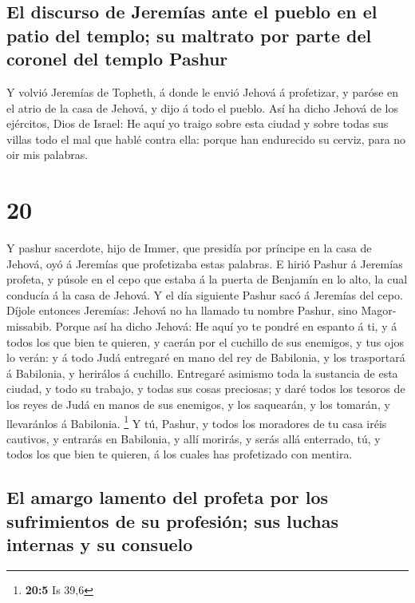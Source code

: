 \hypertarget{el-discurso-de-jeremuxedas-ante-el-pueblo-en-el-patio-del-templo-su-maltrato-por-parte-del-coronel-del-templo-pashur}{%
\subsection{El discurso de Jeremías ante el pueblo en el patio del
templo; su maltrato por parte del coronel del templo
Pashur}\label{el-discurso-de-jeremuxedas-ante-el-pueblo-en-el-patio-del-templo-su-maltrato-por-parte-del-coronel-del-templo-pashur}}

 Y volvió Jeremías de Topheth, á donde le envió Jehová á
profetizar, y paróse en el atrio de la casa de Jehová, y dijo á todo el
pueblo.  Así ha dicho Jehová de los ejércitos, Dios de
Israel: He aquí yo traigo sobre esta ciudad y sobre todas sus villas
todo el mal que hablé contra ella: porque han endurecido su cerviz, para
no oir mis palabras.

\hypertarget{section-19}{%
\section{20}\label{section-19}}

 Y pashur sacerdote, hijo de Immer, que presidía por
príncipe en la casa de Jehová, oyó á Jeremías que profetizaba estas
palabras.  E hirió Pashur á Jeremías profeta, y púsole en el
cepo que estaba á la puerta de Benjamín en lo alto, la cual conducía á
la casa de Jehová.  Y el día siguiente Pashur sacó á
Jeremías del cepo. Díjole entonces Jeremías: Jehová no ha llamado tu
nombre Pashur, sino Magor-missabib.  Porque así ha dicho
Jehová: He aquí yo te pondré en espanto á ti, y á todos los que bien te
quieren, y caerán por el cuchillo de sus enemigos, y tus ojos lo verán:
y á todo Judá entregaré en mano del rey de Babilonia, y los trasportará
á Babilonia, y herirálos á cuchillo.  Entregaré asimismo
toda la sustancia de esta ciudad, y todo su trabajo, y todas sus cosas
preciosas; y daré todos los tesoros de los reyes de Judá en manos de sus
enemigos, y los saquearán, y los tomarán, y llevaránlos á Babilonia.
\footnote{\textbf{20:5} Is 39,6}  Y tú, Pashur, y todos los
moradores de tu casa iréis cautivos, y entrarás en Babilonia, y allí
morirás, y serás allá enterrado, tú, y todos los que bien te quieren, á
los cuales has profetizado con mentira.

\hypertarget{el-amargo-lamento-del-profeta-por-los-sufrimientos-de-su-profesiuxf3n-sus-luchas-internas-y-su-consuelo}{%
\subsection{El amargo lamento del profeta por los sufrimientos de su
profesión; sus luchas internas y su
consuelo}\label{el-amargo-lamento-del-profeta-por-los-sufrimientos-de-su-profesiuxf3n-sus-luchas-internas-y-su-consuelo}}


